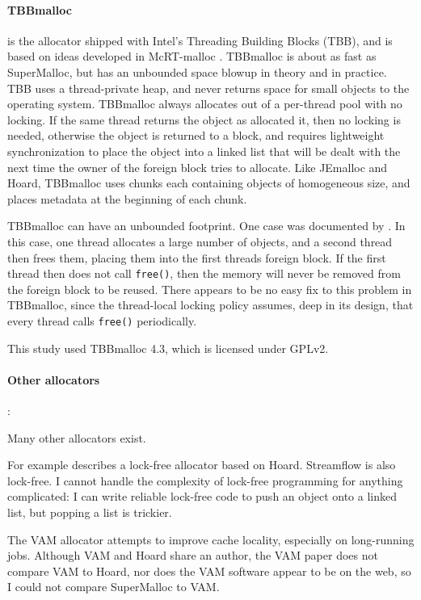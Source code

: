 \documentclass[natbib,sort&compress,10pt]{sigplanconf}
\newcommand{\code}[1]{\texttt{#1}}
\begin{document}
{\paragraph{TBBmalloc}} \cite{KukanovVo07} is the allocator shipped
with Intel's Threading Building Blocks (TBB), and is based on ideas
developed in McRT-malloc \cite{HudsonSaAd06}.  TBBmalloc is about as
fast as SuperMalloc, but has an unbounded space blowup in theory and
in practice.  TBB uses a thread-private heap, and never returns space
for small objects to the operating system.  TBBmalloc always allocates
out of a per-thread pool with no locking.  If the same thread returns
the object as allocated it, then no locking is needed, otherwise the
object is returned to a  block, and requires lightweight
synchronization to place the object into a linked list that will be
dealt with the next time the owner of the foreign block tries to
allocate.  Like JEmalloc and Hoard, TBBmalloc uses chunks each
containing objects of homogeneous size, and places metadata at the
beginning of each chunk.

TBBmalloc can have an unbounded footprint.  One case was documented by
\cite{Vyukov08}.  In this case, one thread allocates a large number of
objects, and a second thread then frees them, placing them into the
first threads foreign block.  If the first thread then does not call
\code{free()}, then the memory will never be removed from the foreign
block to be reused.  There appears to be no easy fix to this problem
in TBBmalloc, since the thread-local locking policy assumes, deep in
its design, that every thread calls \code{free()} periodically.

This study used TBBmalloc 4.3, which is licensed under GPLv2.

{\paragraph{Other allocators}:} Many other allocators exist.

For example \cite{Michael04} describes a lock-free allocator based on
Hoard.  Streamflow \cite{SchneiderAnNi06} is also lock-free.  I cannot
handle the complexity of lock-free programming for anything
complicated: I can write reliable lock-free code to push an object
onto a linked list, but popping a list is trickier.

The VAM allocator \cite{FengBe05} attempts to improve cache locality,
especially on long-running jobs.  Although VAM and Hoard share an
author, the VAM paper does not compare VAM to Hoard, nor does the VAM
software appear to be on the web, so I could not compare SuperMalloc
to VAM\@.
\end{document}
